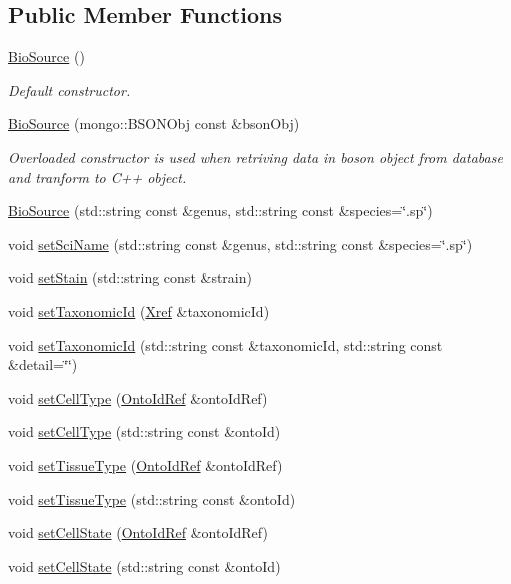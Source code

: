 \subsection*{Public Member Functions}
\begin{DoxyCompactItemize}
\item 
\hyperlink{classunisys_1_1BioSource_afaab055566a306abfb6ed62a81804114}{Bio\-Source} ()
\begin{DoxyCompactList}\small\item\em Default constructor. \end{DoxyCompactList}\item 
\hyperlink{classunisys_1_1BioSource_a5735f4886634f91d10529995582ea5aa}{Bio\-Source} (mongo\-::\-B\-S\-O\-N\-Obj const \&bson\-Obj)
\begin{DoxyCompactList}\small\item\em Overloaded constructor is used when retriving data in boson object from database and tranform to C++ object. \end{DoxyCompactList}\item 
\hyperlink{classunisys_1_1BioSource_adee19e8a8a7030c47126dc2f2187ef6a}{Bio\-Source} (std\-::string const \&genus, std\-::string const \&species=\char`\"{}.sp\char`\"{})
\item 
void \hyperlink{classunisys_1_1BioSource_a612eb3d5e537c1c91353d0534c099856}{set\-Sci\-Name} (std\-::string const \&genus, std\-::string const \&species=\char`\"{}.sp\char`\"{})
\item 
void \hyperlink{classunisys_1_1BioSource_a804bf9b002185e4becd02314621fb9d5}{set\-Stain} (std\-::string const \&strain)
\item 
void \hyperlink{classunisys_1_1BioSource_a331ad3e04f991ee9cbff05563c52d06f}{set\-Taxonomic\-Id} (\hyperlink{classunisys_1_1Xref}{Xref} \&taxonomic\-Id)
\item 
void \hyperlink{classunisys_1_1BioSource_a4024f5f1324dbb54cc17a449a7a865aa}{set\-Taxonomic\-Id} (std\-::string const \&taxonomic\-Id, std\-::string const \&detail=\char`\"{}\char`\"{})
\item 
void \hyperlink{classunisys_1_1BioSource_afcee59fdda1ffa6ba6123bffaf4bca30}{set\-Cell\-Type} (\hyperlink{classunisys_1_1OntoIdRef}{Onto\-Id\-Ref} \&onto\-Id\-Ref)
\item 
void \hyperlink{classunisys_1_1BioSource_ab66aa67148963a6a37b987ec8ca38cf4}{set\-Cell\-Type} (std\-::string const \&onto\-Id)
\item 
void \hyperlink{classunisys_1_1BioSource_a62c834b403fe514557c99c7cd2a0fe94}{set\-Tissue\-Type} (\hyperlink{classunisys_1_1OntoIdRef}{Onto\-Id\-Ref} \&onto\-Id\-Ref)
\item 
void \hyperlink{classunisys_1_1BioSource_a310667660d177c71b465bcc5f7e967db}{set\-Tissue\-Type} (std\-::string const \&onto\-Id)
\item 
void \hyperlink{classunisys_1_1BioSource_a902f6c3164f677a204e3bbb828f3dde4}{set\-Cell\-State} (\hyperlink{classunisys_1_1OntoIdRef}{Onto\-Id\-Ref} \&onto\-Id\-Ref)
\item 
void \hyperlink{classunisys_1_1BioSource_ac4545f8b833415e88fa734ab0f7e3034}{set\-Cell\-State} (std\-::string const \&onto\-Id)
\end{DoxyCompactItemize}
